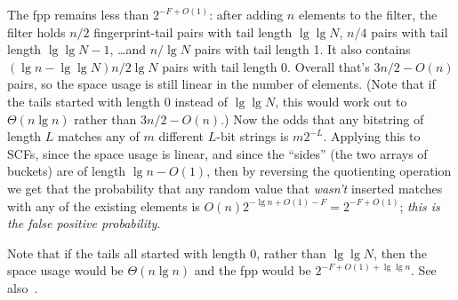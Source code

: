 \documentclass[letterpaper,twocolumn,10pt]{article}
\newcommand{\ints}{\mathbb{Z}}
\newcommand{\TCF}{SCF}
\newcommand{\TCF}{TCF}
\begin{document}
The fpp remains less than $2^{-F+O(1)}$:
after adding $n$ elements to the filter, the filter holds $n/2$ fingerprint-tail pairs with tail length $\lg \lg N$, $n/4$ pairs with tail length $\lg \lg N - 1$, \dots and $n/\lg N$ pairs with tail length 1.
It also contains $(\lg n - \lg \lg N)  n / 2 \lg N$ pairs with tail length 0.
Overall that's $3n/2 - O(n)$ pairs, so the space usage is still linear in the number of elements.
(Note that if the tails started with length 0 instead of $\lg \lg N$, this would work out to $\Theta(n \lg n)$ rather than $3n/2 - O(n)$.)
Now the odds that any bitstring of length $L$ matches any of $m$ different $L$-bit strings is $m 2^{-L}$.
Applying this to \TCF{}s, since the space usage is linear, and since the ``sides'' (the two arrays of buckets) are of length $\lg n - O(1)$, then by reversing the quotienting operation we get that the probability that any random value that {\em wasn't} inserted matches with any of the existing elements is $O(n) 2^{-\lg n + O(1) - F} = 2^{-F+O(1)}$; {\em this is the false positive probability}.

Note that if the tails all started with length 0, rather than $\lg \lg N$, then the space usage would be $\Theta(n \lg n)$ and the fpp would be $2^{-F+O(1) + \lg \lg n}$.
See also~\cite{psw}.



\end{document}
